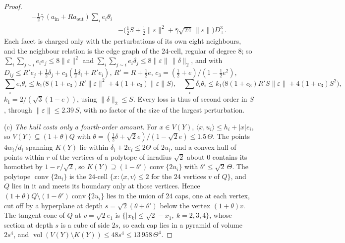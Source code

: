 \documentclass[11pt,reqno]{amsart}
\renewcommand{\_}{\origunderscore\allowbreak}
\numberwithin{equation}{section}
\theoremstyle{plain}
\theoremstyle{definition}
\theoremstyle{remark}
\DeclareMathOperator{\vol}{vol}
\DeclareMathOperator{\conv}{conv}
\begin{document}
\begin{proof}
\begin{align*}
  -\tfrac12\bar\gamma\,(a_{\mathrm{in}}+Ra_{\mathrm{out}})\sum_ie_i\theta_i\\
  &-\bigl(\tfrac12S+\tfrac12\|\varepsilon\|^2+\bar\gamma\sqrt{24}\,\|\varepsilon\|\bigr)D_\perp^3 .
\end{align*}
Each facet is charged only with the perturbations of its own eight
neighbours, and the neighbour relation is the edge graph of the $24$-cell,
regular of degree $8$; so
$\sum_i\sum_{j\sim i}e_ie_j\le8\|\varepsilon\|^2$ and
$\sum_i\sum_{j\sim i}e_i\delta_j\le8\|\varepsilon\|\,\|\delta\|_2$, and with
$D_{ij}\le R'e_j+\frac12\delta_j+c_3(\frac12\delta_i+R'e_i)$,
$R'=R+\frac12e$, $c_3=(\frac12+e)/(1-\frac12e^2)$,
\[
  \sum_ie_i\theta_i\le k_1\bigl(8(1+c_3)R'\|\varepsilon\|^2+4(1+c_3)\|\varepsilon\|S\bigr),\quad
  \sum_i\delta_i\theta_i\le k_1\bigl(8(1+c_3)R'S\|\varepsilon\|+4(1+c_3)S^2\bigr),
\]
$k_1=2/(\sqrt3(1-e))$, using $\|\delta\|_2\le S$. Every loss is thus of
second order in $S$, through $\|\varepsilon\|\le2.39\,S$, with no factor of
the size of the largest perturbation.

(c) \emph{The hull costs only a fourth-order amount.} For $x\in V(Y)$,
$\langle x,u_i\rangle\le h_i+|x|e_i$, so $V(Y)\subseteq(1+\theta)Q$ with
$\theta=(\frac12\delta+\sqrt2e)/(1-\sqrt2e)\le1.5\,\Theta$. The points
$4w_i/d_i$ spanning $K(Y)$ lie within $\delta_i+2e_i\le2\Theta$ of $2u_i$,
and a convex hull of points within $r$ of the vertices of a polytope of
inradius $\sqrt2$ about $0$ contains its homothet by $1-r/\sqrt2$, so
$K(Y)\supseteq(1-\theta')\conv\{2u_i\}$ with $\theta'\le\sqrt2\,\Theta$. The
polytope $\conv\{2u_i\}$ is the $24$-cell $\{x:\langle x,v\rangle\le2$ for
the $24$ vertices $v$ of $Q\}$, and $Q$ lies in it and meets its boundary
only at those vertices. Hence $(1+\theta)Q\setminus(1-\theta')\conv\{2u_i\}$
lies in the union of $24$ caps, one at each vertex, cut off by a hyperplane at
depth $s=\sqrt2(\theta+\theta')$ below the vertex $(1+\theta)v$. The tangent
cone of $Q$ at $v=\sqrt2e_1$ is $\{|x_k|\le\sqrt2-x_1,\ k=2,3,4\}$, whose
section at depth $s$ is a cube of side $2s$, so each cap lies in a pyramid
of volume $2s^4$, and
$\vol(V(Y)\setminus K(Y))\le48s^4\le13\,958\,\Theta^4$.


\end{proof}
\end{document}
